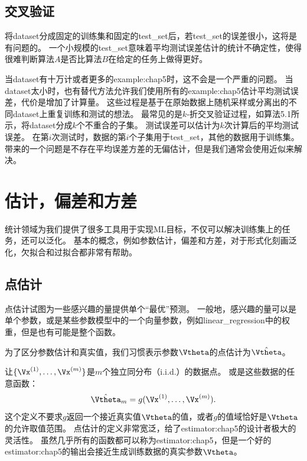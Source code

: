 \subsection{交叉验证}
\label{sec:cross_validation}
将\gls{dataset}分成固定的训练集和固定的\gls{test_set}后，若\gls{test_set}的误差很小，这将是有问题的。
一个小规模的\gls{test_set}意味着平均测试误差估计的统计不确定性，使得很难判断算法$A$是否比算法$B$在给定的任务上做得更好。


当\gls{dataset}有十万计或者更多的\gls{example:chap5}时，这不会是一个严重的问题。
当\gls{dataset}太小时，也有替代方法允许我们使用所有的\gls{example:chap5}估计平均测试误差，代价是增加了计算量。
这些过程是基于在原始数据上随机采样或分离出的不同\gls{dataset}上重复训练和测试的想法。
最常见的是$k$-折交叉验证过程，如算法5.1所示，将\gls{dataset}分成$k$个不重合的子集。
测试误差可以估计为$k$次计算后的平均测试误差。
在第$i$次测试时，数据的第$i$个子集用于\gls{test_set}，其他的数据用于训练集。
带来的一个问题是不存在平均误差方差的无偏估计\citep{Bengio-Grandvalet-JMLR-04}，但是我们通常会使用近似来解决。

\section{估计，偏差和方差}
\label{sec:estimators_bias_and_variance}
统计领域为我们提供了很多工具用于实现\gls{ML}目标，不仅可以解决训练集上的任务，还可以泛化。
基本的概念，例如参数估计，偏差和方差，对于形式化刻画泛化，欠拟合和过拟合都非常有帮助。

\subsection{点估计}
\label{sec:point_estimation}
点估计试图为一些感兴趣的量提供单个``最优''预测。
一般地，感兴趣的量可以是单个参数，或是某些参数模型中的一个向量参数，例如\gls{linear_regression}中的权重，但是也有可能是整个函数。

为了区分参数估计和真实值，我们习惯表示参数$\Vtheta$的点估计为$\hat{\Vtheta}$。

让$\{\Vx^{(1)},\dots,\Vx^{(m)}\}$是$m$个独立同分布（i.i.d.）的数据点。
或是这些数据的任意函数：
\begin{equation}
    \hat{\Vtheta}_m = g(\Vx^{(1)}, \dots, \Vx^{(m)}) .
\end{equation}
这个定义不要求$g$返回一个接近真实值$\Vtheta$的值，或者$g$的值域恰好是$\Vtheta$的允许取值范围。
点估计的定义非常宽泛，给了\gls{estimator:chap5}的设计者极大的灵活性。
虽然几乎所有的函数都可以称为\gls{estimator:chap5}，但是一个好的\gls{estimator:chap5}的输出会接近生成训练数据的真实参数$\Vtheta$。

